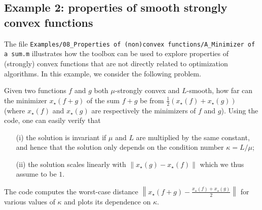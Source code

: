 \documentclass[11pt,a4paper]{article}
\newcommand{\norm}[1]{{\left\lVert#1\right\rVert}}
\begin{document}
\subsection{Example 2: properties of smooth strongly convex functions}
The file \verb?Examples/08_Properties of (non)convex functions/A_Minimizer of a sum.m? illustrates how the toolbox can be used to explore properties of (strongly) convex functions that are not directly related to optimization algorithms. In this example, we consider the following problem.

Given two functions $f$ and $g$ both $\mu$-strongly convex and $L$-smooth, how far can the minimizer $x_\star(f+g)$ of the sum $f+g$ be from $\tfrac12 (x_\star(f)+x_\star(g))$ (where $x_\star(f)$ and $x_\star(g)$ are respectively the minimizers of $f$ and $g$). Using the code, one can easily verify that
\begin{itemize}
	\item[(i)] the solution is invariant if $\mu$ and $L$ are multiplied by the same constant, and hence that the solution only depends on the condition number $\kappa = L/\mu$;
	\item[(ii)] the solution scales linearly with $\norm{x_\star(g)-x_\star(f)}$ which we thus assume to be $1$.
\end{itemize}
The code computes the worst-case distance $\norm{x_\star(f+g)-\tfrac{x_\star(f)+x_\star(g)}{2}}$ for various values of $\kappa$ and plots its dependence on $\kappa$.
\end{document}
